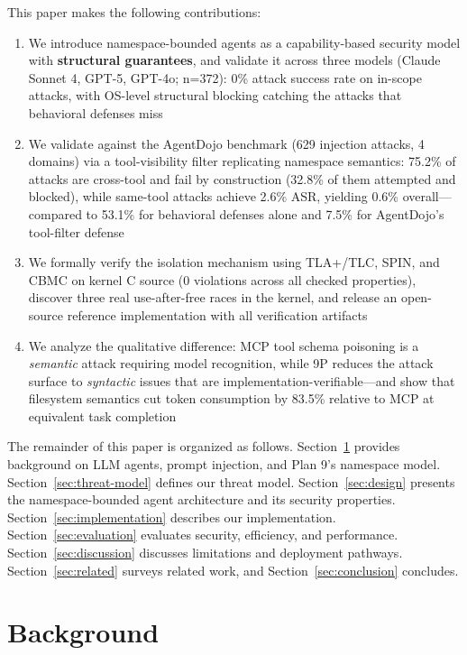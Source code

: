 \documentclass[acmsmall,screen,review]{acmart}
\begin{document}
This paper makes the following contributions:

\begin{enumerate}
    \item We introduce namespace-bounded agents as a capability-based security model with \textbf{structural guarantees}, and validate it across three models (Claude Sonnet 4, GPT-5, GPT-4o; n=372): 0\% attack success rate on in-scope attacks, with OS-level structural blocking catching the attacks that behavioral defenses miss
    \item We validate against the AgentDojo benchmark (629 injection attacks, 4 domains) via a tool-visibility filter replicating namespace semantics: 75.2\% of attacks are cross-tool and fail by construction (32.8\% of them attempted and blocked), while same-tool attacks achieve 2.6\% ASR, yielding 0.6\% overall---compared to 53.1\% for behavioral defenses alone and 7.5\% for AgentDojo's tool-filter defense
    \item We formally verify the isolation mechanism using TLA+/TLC, SPIN, and CBMC on kernel C source (0 violations across all checked properties), discover three real use-after-free races in the kernel, and release an open-source reference implementation with all verification artifacts
    \item We analyze the qualitative difference: MCP tool schema poisoning is a \textit{semantic} attack requiring model recognition, while 9P reduces the attack surface to \textit{syntactic} issues that are implementation-verifiable---and show that filesystem semantics cut token consumption by 83.5\% relative to MCP at equivalent task completion
\end{enumerate}

The remainder of this paper is organized as follows. Section~\ref{sec:background} provides background on LLM agents, prompt injection, and Plan 9's namespace model. Section~\ref{sec:threat-model} defines our threat model. Section~\ref{sec:design} presents the namespace-bounded agent architecture and its security properties. Section~\ref{sec:implementation} describes our implementation. Section~\ref{sec:evaluation} evaluates security, efficiency, and performance. Section~\ref{sec:discussion} discusses limitations and deployment pathways. Section~\ref{sec:related} surveys related work, and Section~\ref{sec:conclusion} concludes.

\section{Background}
\label{sec:background}
\end{document}
